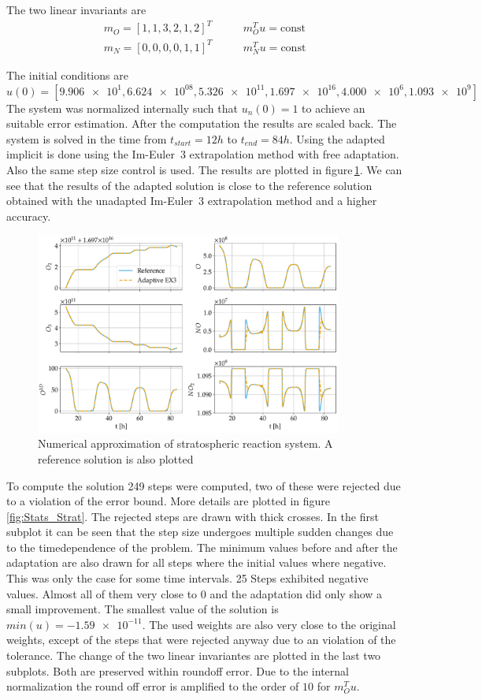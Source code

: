 The two linear invariants are 
\begin{align}
m_O = [1,1,3,2,1,2]^T & \qquad m_O^Tu=\text{const} \\
m_N = [0,0,0,0,1,1]^T & \qquad m_N^Tu=\text{const}
\end{align}

The initial conditions are $u(0)=[\num{9.906e+1},\num{6.624e08},\num{5.326e11},\num{1.697e16},\num{4.000e6},\num{1.093e9}]$
The system was normalized internally such that $u_n(0)=1$ to achieve an suitable error estimation. After the computation the results are scaled back.
The system is solved in the time from $t_{start}=12h$ to $t_{end}=84h$. Using the adapted implicit is done using the Im-Euler~3 extrapolation method with free adaptation. 
Also the same step size control is used. 
The results are plotted in figure\,\ref{fig:Stratospheric_time}. We can see that the results of the adapted solution is close to the reference solution obtained with the unadapted Im-Euler~3 extrapolation method and a higher accuracy.

\begin{figure}
\centering
\includegraphics[width=0.9\textwidth]{plots/Stratospheric_time.pdf}
\caption{Numerical approximation of stratospheric reaction system. A reference solution is also plotted}
\label{fig:Stratospheric_time}
\end{figure}

To compute the solution 249 steps were computed, two of these were rejected due to a violation of the error bound.
More details are plotted in figure\,\ref{fig:Stats_Strat}. The rejected steps are drawn with thick crosses.
In the first subplot it can be seen that the step size undergoes multiple sudden changes due to the timedependence of the problem.
The minimum values before and after the adaptation are also drawn for all steps where the initial values where negative. 
This was only the case for some time intervals. 25 Steps exhibited negative values.
Almost all of them very close to 0 and the adaptation did only show a small improvement. 
The smallest value of the solution is $min(u) = \num{-1.59e-11}$.
The used weights are also very close to the original weights, except of the steps that were rejected anyway due to an violation of the tolerance.
The change of the two linear invariantes are plotted in the last two subplots. Both are preserved within roundoff error.
Due to the internal normalization the round off error is amplified to the order of $10$ for $m_O^Tu$. 



